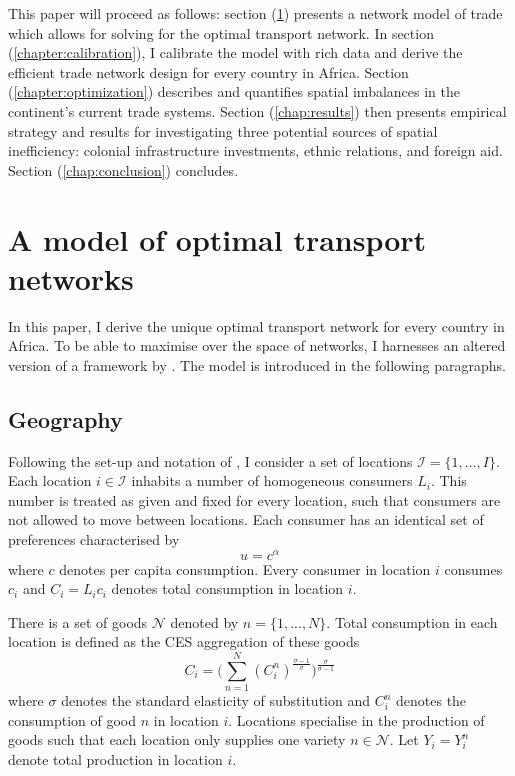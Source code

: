 \documentclass[11pt, oneside]{article}   	%
\let\oldref\ref
\renewcommand{\ref}[1]{(\oldref{#1})}
\begin{document}
This paper will proceed as follows: section \ref{chap:model} presents a network model of trade which allows for solving for the optimal transport network. In section \ref{chapter:calibration}, I calibrate the model with rich data and derive the efficient trade network design for every country in Africa. Section \ref{chapter:optimization} describes and quantifies spatial imbalances in the continent's current trade systems. Section \ref{chap:results} then presents empirical strategy and results for investigating three potential sources of spatial inefficiency: colonial infrastructure investments, ethnic relations, and foreign aid. Section \ref{chap:conclusion} concludes.

\section{A model of optimal transport networks}
\label{chap:model}
In this paper, I derive the unique optimal transport network for every country in Africa. To be able to maximise over the space of networks, I harnesses an altered version of a framework by \cite{Fajgelbaum_OptimalTransportNetworks_2017}. The model is introduced in the following paragraphs.

\subsection{Geography}

Following the set-up and notation of \cite{Fajgelbaum_OptimalTransportNetworks_2017}, I consider a set of locations $\mathcal{I} =\{ 1,...,I\}$. Each location $i \in \mathcal{I}$ inhabits a number of homogeneous consumers $L_{i}$. This number is treated as given and fixed for every location, such that consumers are not allowed to move between locations. Each consumer has an identical set of preferences characterised by
\begin{equation*}
  u = c^{\alpha}
\end{equation*}
where $c$ denotes per capita consumption. Every consumer in location $i$ consumes $c_{i}$ and $C_{i} = L_{i}c_{i}$ denotes total consumption in location $i$.

There is a set of goods $\mathcal{N}$ denoted by $n =\{ 1,...,N\}$. Total consumption in each location is defined as the CES aggregation of these goods
\begin{equation*}
  C_{i} = \bigg( \sum_{n=1}^{N} (C_{i}^{n})^{\frac{\sigma-1}{\sigma}}\bigg)^{\frac{\sigma}{\sigma-1}}
\end{equation*}
where $\sigma$ denotes the standard elasticity of substitution and $C_{i}^{n}$ denotes the consumption of good $n$ in location $i$. Locations specialise in the production of goods such that each location only supplies one variety $n \in \mathcal{N}$. Let $Y_{i} = Y_{i}^{n}$ denote total production in location $i$.
\end{document}
